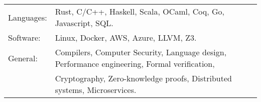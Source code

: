 \begin{tabular}{l l}
  Languages: & Rust, C/C++, Haskell, Scala, OCaml, Coq, Go, Javascript, SQL. \\
  Software: & Linux, Docker, AWS, Azure, LLVM, Z3. \\
  General: & Compilers, Computer Security, Language design, Performance engineering, Formal verification,\\
         & Cryptography, Zero-knowledge proofs, Distributed systems, Microservices. \\
\end{tabular}


